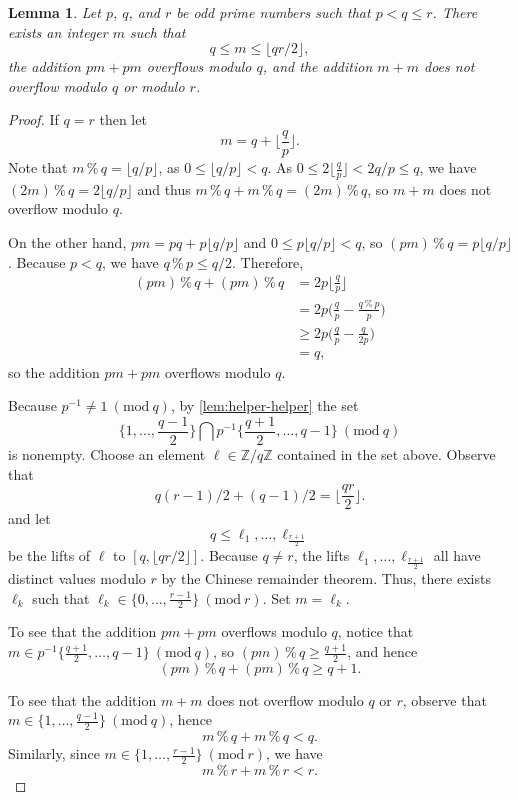 \documentclass[letterpaper,10pt]{amsart}
\DeclareMathOperator{\perc}{\%}
\newcommand{\ZZ}{\mathbb{Z}}      %
\newcommand{\Mod}[1]{\ (\mathrm{mod}\ #1)}
\newtheorem{lemma}[theorem]{Lemma}
\theoremstyle{definition}
\theoremstyle{remark}
\begin{document}
\begin{lemma}
\label{lem:pqr-helper}
Let $p$, $q$, and $r$ be odd prime numbers such that $p < q \leq r$. There exists an integer $m$ such that 
\[
	q \leq m \leq \lfloor qr/2 \rfloor,
\]
the addition $pm + pm$ overflows modulo $q$, and the addition $m + m$ does not overflow modulo $q$ or modulo $r$.
\end{lemma}
\begin{proof}
If $q = r$ then let
\[
	m = q + \bigg \lfloor \frac{q}{p} \bigg \rfloor.
\] 
Note that $m\perc q =  \lfloor q/p \rfloor$, as $0 \leq \lfloor q/p \rfloor < q$. As $0 \leq 2 \lfloor \frac{q}{p} \rfloor < 2q/p \leq q$, we have $(2m)\perc q = 2\lfloor q/p \rfloor$ and thus $m\perc q + m\perc q = (2m)\perc q$, so $m + m$ does not overflow modulo $q$.

On the other hand,  $pm = pq + p\lfloor q/p\rfloor$ and $0 \leq p\lfloor q/p\rfloor < q$, so $(pm)\perc q = p\lfloor q/p\rfloor$. Because $p < q$, we have $q\perc p \leq q/2$. Therefore,
\begin{align*}
(pm)\perc q + (pm)\perc q &= 2p\bigg \lfloor \frac{q}{p} \bigg \rfloor \\
&= 2p\bigg (\frac{q}{p}-\frac{q\perc p}{p}\bigg) \\
&\geq  2p\bigg (\frac{q}{p}-\frac{q}{2p}\bigg) \\
&= q,
\end{align*}
so the addition $pm + pm$ overflows modulo $q$.

Because $p^{-1} \neq 1 \Mod{q}$, by \cref{lem:helper-helper} the set
\[
	\bigg\{1,\dots,\frac{q-1}{2}\bigg\} \bigcap p^{-1}\bigg\{\frac{q+1}{2},\dots,q-1\bigg\} \Mod{q}
\]
is nonempty. Choose an element $\ell \in \ZZ/q\ZZ$ contained in the set above. Observe that 
\[
	q(r-1)/2 + (q-1)/2 = \bigg \lfloor \frac{qr}{2} \bigg \rfloor.
\]
and let
\[
	q \leq \ell_1,\dots, \ell_{\frac{r+1}{2}} 
\]
be the lifts of $\ell$ to $[q, \lfloor qr/2 \rfloor]$. Because $q \neq r$, the lifts $\ell_1,\dots, \ell_{\frac{r+1}{2}}$ all have distinct values modulo $r$ by the Chinese remainder theorem. Thus, there exists $\ell_k$ such that $\ell_k \in \{0,\dots, \frac{r-1}{2}\} \Mod{r}$. Set $m = \ell_k$.

To see that the addition $pm + pm$ overflows modulo $q$, notice that $m \in p^{-1}\{\frac{q+1}{2},\dots,q-1\} \Mod{q}$, so $(pm)\perc q \geq \frac{q+1}{2}$, and hence 
\[
	(pm)\perc q + (pm)\perc q \geq q+1.
\]

To see that the addition $m + m$ does not overflow modulo $q$ or $r$, observe that $m \in \{1,\dots,\frac{q-1}{2}\} \Mod{q}$, hence
\[
	m\perc q + m\perc q < q.
\] 
Similarly, since $m \in \{1,\dots,\frac{r-1}{2}\} \Mod{r}$, we have
\[
	m\perc r + m\perc r < r.
\] 
\end{proof}
\end{document}
